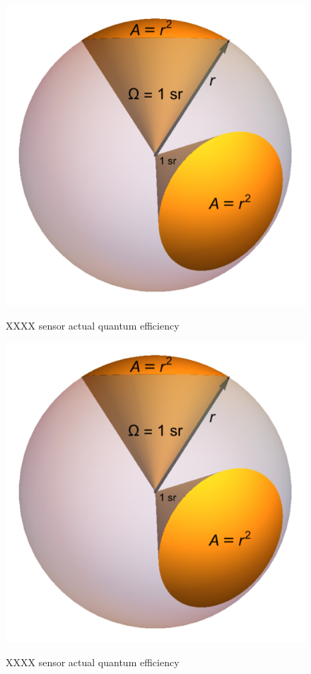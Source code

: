 \documentclass{article}
\begin{document}
      \begin{figure}[h!]
	\includegraphics[width=1.0\textwidth]{../../figures/Solid_Angle_1_Steradian.png}\\
	\caption{XXXX sensor actual quantum efficiency}
      \end{figure}
      \begin{figure}[h!]
	\includegraphics[width=1.0\textwidth]{../../figures/Solid_Angle_1_Steradian.png}\\
	\caption{XXXX sensor actual quantum efficiency}
      \end{figure}
\end{document}

